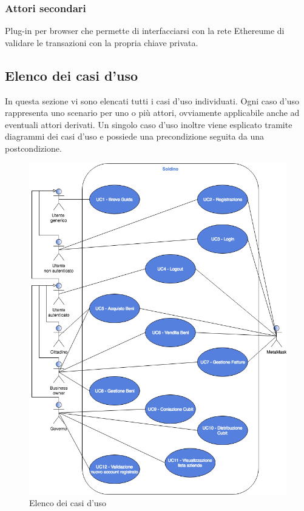 \subsubsection{Attori secondari}
\begin{description}[style=nextline]
	\item[MetaMask]
	Plug-in per browser che permette di interfacciarsi con la rete Ethereum\glosp e di validare le transazioni con la propria chiave privata.

\end{description}

\subsection{Elenco dei casi d'uso}
In questa sezione vi sono elencati tutti i casi d'uso individuati. Ogni caso d'uso rappresenta uno scenario per uno o più attori, ovviamente applicabile anche ad eventuali attori derivati. Un singolo caso d'uso inoltre viene esplicato tramite diagrammi dei casi d'uso e possiede una precondizione seguita da una postcondizione.\\
\begin{figure}[h]
	\includegraphics[width=11.93cm]{res/images/Elenco_casi_d_uso.png}
	\centering
	\caption{Elenco dei casi d'uso}
\end{figure}\\
